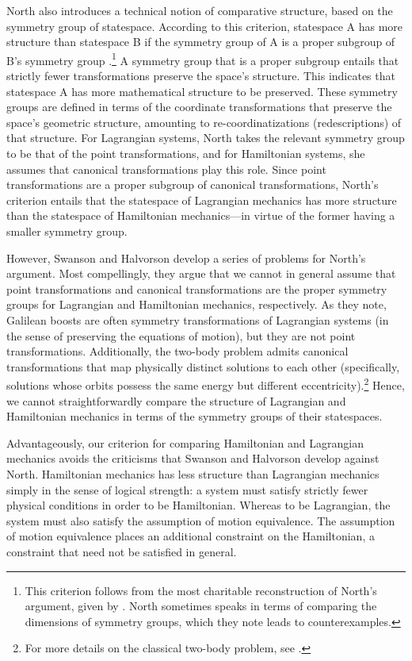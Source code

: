 \documentclass[letterpaper]{article}
\begin{document}
North also introduces a technical notion of comparative structure, based on the symmetry group of statespace. According to this criterion, statespace A has more structure than statespace B if the symmetry group of A is a proper subgroup of B's symmetry group \parencites[87-88]{North}.\footnote{This criterion follows from the most charitable reconstruction of North's argument, given by \textcites[]{Swanson}. North sometimes speaks in terms of comparing the dimensions of symmetry groups, which they note leads to counterexamples.} A symmetry group that is a proper subgroup entails that strictly fewer transformations preserve the space's structure. This indicates that statespace A has more mathematical structure to be preserved. These symmetry groups are defined in terms of the coordinate transformations that preserve the space's geometric structure, amounting to re-coordinatizations (redescriptions) of that structure. For Lagrangian systems, North takes the relevant symmetry group to be that of the point transformations, and for Hamiltonian systems, she assumes that canonical transformations play this role. Since point transformations are a proper subgroup of canonical transformations, North's criterion entails that the statespace of Lagrangian mechanics has more structure than the statespace of Hamiltonian mechanics---in virtue of the former having a smaller symmetry group. 

However, Swanson and Halvorson \parencites*[]{Swanson} develop a series of problems for North's argument. Most compellingly, they argue that we cannot in general assume that point transformations and canonical transformations are the proper symmetry groups for Lagrangian and Hamiltonian mechanics, respectively. As they note, Galilean boosts are often symmetry transformations of Lagrangian systems (in the sense of preserving the equations of motion), but they are not point transformations. Additionally, the two-body problem admits canonical transformations that map physically distinct solutions to each other (specifically, solutions whose orbits possess the same energy but different eccentricity).\footnote{For more details on the classical two-body problem, see \textcites[]{Belot}.} Hence, we cannot straightforwardly compare the structure of Lagrangian and Hamiltonian mechanics in terms of the symmetry groups of their statespaces. 

Advantageously, our criterion for comparing Hamiltonian and Lagrangian mechanics avoids the criticisms that Swanson and Halvorson develop against North. Hamiltonian mechanics has less structure than Lagrangian mechanics simply in the sense of logical strength: a system must satisfy strictly fewer physical conditions in order to be Hamiltonian. Whereas to be Lagrangian, the system must also satisfy the assumption of motion equivalence. The assumption of motion equivalence places an additional constraint on the Hamiltonian, a constraint that need not be satisfied in general. 
\end{document}
